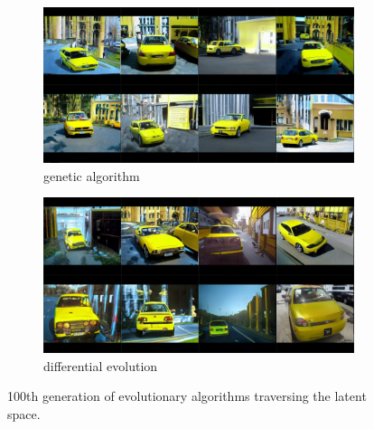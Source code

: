 \documentclass[11pt,a4paper,openany]{book}
\begin{document}
\begin{figure}[H]
\centering
\begin{subfigure}[b]{1.0\textwidth}
   \includegraphics[width=1\linewidth]{GA_yellowcar_100.PNG}
   \caption{genetic algorithm}
   \label{fig:Ng1} 
\end{subfigure}

\begin{subfigure}[b]{1.0\textwidth}
   \includegraphics[width=1\linewidth]{DE_yellowcar_100.PNG}
   \caption{differential evolution}
   \label{fig:Ng2}
\end{subfigure}

\caption[Two numerical solutions]{100th generation of evolutionary algorithms traversing the latent space.}
\end{figure}

\newpage
\end{document}
